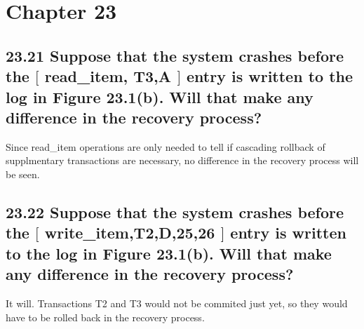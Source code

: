 \section*{Chapter 23}

\subsection*{23.21 Suppose that the system crashes before the $\lbrack$ read\_item, T3,A $\rbrack$ entry is written to the log in Figure 23.1(b). Will that make any difference in the recovery process?}

Since read\_item operations are only needed to tell if cascading rollback of supplmentary transactions are necessary, no difference in the recovery process will be seen.

\subsection*{23.22 Suppose that the system crashes before the $\lbrack$ write\_item,T2,D,25,26 $\rbrack$ entry is written to the log in Figure 23.1(b). Will that make any difference in the recovery process?}

It will. Transactions T2 and T3 would not be commited just yet, so they would have to be rolled back in the recovery process.